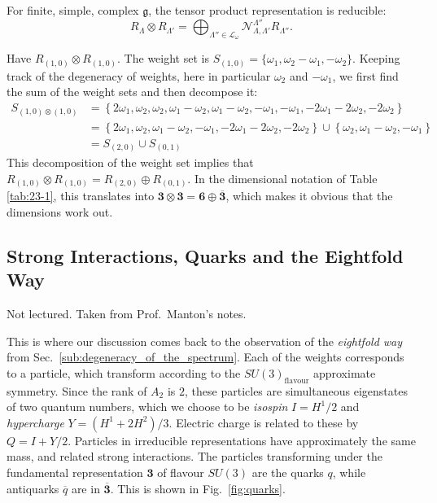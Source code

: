For finite, simple, complex $\mathfrak{g}$, the tensor product representation is reducible:
\begin{equation}
  R_{\Lambda} \otimes R_{\Lambda'} = \bigoplus_{\Lambda'' \in \mathcal{L}_\omega} \mathcal{N}_{\Lambda, \Lambda'}^{\Lambda''} R_{\Lambda''}.
\end{equation}

\begin{example}[$\mathfrak{g} = A_2$]
  Have $R_{(1, 0)} \otimes R_{(1, 0)}$. The weight set is $S_{(1, 0)} = \{\omega_1, \omega_2 - \omega_1, -\omega_2\}$. Keeping track of the degeneracy of weights, here in particular $\omega_2$ and $-\omega_1$, we first find the sum of the weight sets and then decompose it:
  \begin{align}
    S_{(1, 0) \otimes (1, 0)} &= \left\{ 2 \omega_1, \omega_2, \omega_2, \omega_1 - \omega_2, \omega_1 - \omega_2, -\omega_1, -\omega_1, -2\omega_1 - 2\omega_2, -2\omega_2 \right\} \\
    &= \left\{ 2\omega_1, \omega_2, \omega_1 - \omega_2, -\omega_1, -2\omega_1 -2\omega_2, -2\omega_2 \right\} \cup \left\{ \omega_2, \omega_1 - \omega_2, -\omega_1 \right\} \\
    &= S_{(2, 0)} \cup S_{(0, 1)}
  \end{align}
  This decomposition of the weight set implies that $R_{(1, 0)} \otimes R_{(1, 0)} = R_{(2, 0)} \oplus R_{(0, 1)}$.  In the dimensional notation of Table \ref{tab:23-1}, this translates into $\boldsymbol 3 \otimes \boldsymbol 3 = \boldsymbol 6 \oplus \overline{\boldsymbol 3}{}$, which makes it obvious that the dimensions work out.
\end{example}

\subsection{Strong Interactions, Quarks and the Eightfold Way}%
\label{sub:strong_interactions_and_the_eightfold_way}

\begin{leftbar}
  Not lectured. Taken from Prof.~Manton's notes.
\end{leftbar}
This is where our discussion comes back to the observation of the \emph{eightfold way} from Sec.~\ref{sub:degeneracy_of_the_spectrum}.
Each of the weights corresponds to a particle, which transform according to the $SU(3)_{\text{flavour}}$ approximate symmetry. Since the rank of $A_2$ is $2$, these particles are simultaneous eigenstates of two quantum numbers, which we choose to be \emph{isospin} $I = H^1 / 2$ and \emph{hypercharge} $Y = (H^1 + 2 H^2) / 3$. Electric charge is related to these by $Q = I + Y / 2$. Particles in irreducible representations have approximately the same mass, and related strong interactions.
The particles transforming under the fundamental representation $\boldsymbol 3$ of flavour $SU(3)$ are the quarks $q$, while antiquarks $\overline{q}{}$ are in $\overline{\boldsymbol 3}{}$. This is shown in Fig.~\ref{fig:quarks}.


